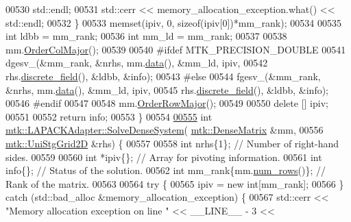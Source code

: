 \begin{DoxyCode}
00530       std::endl;
00531     std::cerr << memory\_allocation\_exception.what() << std::endl;
00532   \}
00533   memset(ipiv, 0, \textcolor{keyword}{sizeof}(ipiv[0])*mm\_rank);
00534 
00535   \textcolor{keywordtype}{int} ldbb = mm\_rank;
00536   \textcolor{keywordtype}{int} mm\_ld = mm\_rank;
00537 
00538   mm.\hyperlink{classmtk_1_1DenseMatrix_a59b9bea24acf39dca64e8549b3527463}{OrderColMajor}();
00539 
00540 \textcolor{preprocessor}{  #ifdef MTK\_PRECISION\_DOUBLE}
00541   dgesv\_(&mm\_rank, &nrhs, mm.\hyperlink{classmtk_1_1DenseMatrix_a0c33b8a9e01d157c61ddbdf807c25d84}{data}(), &mm\_ld, ipiv,
00542          rhs.\hyperlink{classmtk_1_1UniStgGrid1D_ab9c3f9ee2ac76a351b01e4abfede4d19}{discrete\_field}(), &ldbb, &info);
00543 \textcolor{preprocessor}{  #else}
00544   fgesv\_(&mm\_rank, &nrhs, mm.\hyperlink{classmtk_1_1DenseMatrix_a0c33b8a9e01d157c61ddbdf807c25d84}{data}(), &mm\_ld, ipiv,
00545          rhs.\hyperlink{classmtk_1_1UniStgGrid1D_ab9c3f9ee2ac76a351b01e4abfede4d19}{discrete\_field}(), &ldbb, &info);
00546 \textcolor{preprocessor}{  #endif}
00547 
00548   mm.\hyperlink{classmtk_1_1DenseMatrix_ac2949efba3e8278335d45418c85433e4}{OrderRowMajor}();
00549 
00550   \textcolor{keyword}{delete} [] ipiv;
00551 
00552   \textcolor{keywordflow}{return} info;
00553 \}
00554 
\hypertarget{mtk__lapack__adapter_8cc_source_l00555}{}\hyperlink{classmtk_1_1LAPACKAdapter_a6c040471a1e9256bafa74e3603ff7bf5}{00555} \textcolor{keywordtype}{int} \hyperlink{classmtk_1_1LAPACKAdapter_a7428bccf74fd4a4af68fb7233846da22}{mtk::LAPACKAdapter::SolveDenseSystem}(
      \hyperlink{classmtk_1_1DenseMatrix}{mtk::DenseMatrix} &mm,
00556                                          \hyperlink{classmtk_1_1UniStgGrid2D}{mtk::UniStgGrid2D} &rhs) \{
00557 
00558   \textcolor{keywordtype}{int} nrhs\{1\};  \textcolor{comment}{// Number of right-hand sides.}
00559 
00560   \textcolor{keywordtype}{int} *ipiv\{\};                \textcolor{comment}{// Array for pivoting information.}
00561   \textcolor{keywordtype}{int} info\{\};                 \textcolor{comment}{// Status of the solution.}
00562   \textcolor{keywordtype}{int} mm\_rank\{mm.\hyperlink{classmtk_1_1DenseMatrix_a53f3afb3b6a8d21854458aaa9663cc74}{num\_rows}()\}; \textcolor{comment}{// Rank of the matrix.}
00563 
00564   \textcolor{keywordflow}{try} \{
00565     ipiv = \textcolor{keyword}{new} \textcolor{keywordtype}{int}[mm\_rank];
00566   \} \textcolor{keywordflow}{catch} (std::bad\_alloc &memory\_allocation\_exception) \{
00567     std::cerr << \textcolor{stringliteral}{"Memory allocation exception on line "} << \_\_LINE\_\_ - 3 <<

\end{DoxyCode}
